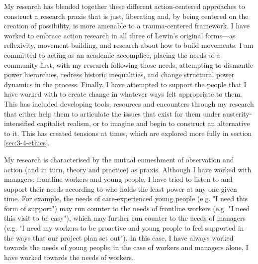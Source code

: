 My research has blended together these different action-centered approaches to construct a research praxis that is just, liberating and, by being centered on the creation of possibility, is more amenable to a trauma-centered framework. I have worked to embrace action research in all three of Lewin's original forms—as reflexivity, movement-building, and research about how to build movements. I am committed to acting as an academic accomplice, placing the needs of a community first, with my research following those needs, attempting to dismantle power hierarchies, redress historic inequalities, and change structural power dynamics in the process. Finally, I have attempted to support the people that I have worked with to create change in whatever ways felt appropriate to them. This has included developing tools, resources and encounters through my research that either help them to articulate the issues that exist for them under austerity-intensified capitalist realism, or to imagine and begin to construct an alternative to it. This has created tensions at times, which are explored more fully in section \ref{sec:3-4-ethics}. 

My research is characterised by the mutual enmeshment of observation and action (and in turn, theory and practice) as praxis. Although I have worked with managers, frontline workers and young people, I have tried to listen to and support their needs according to who holds the least power at any one given time. For example, the needs of care-experienced young people (e.g. "I need this form of support") may run counter to the needs of frontline workers (e.g. "I need this visit to be easy"), which may further run counter to the needs of managers (e.g. "I need my workers to be proactive and young people to feel supported in the ways that our project plan set out"). In this case, I have always worked towards the needs of young people; in the case of workers and managers alone, I have worked towards the needs of workers. 

